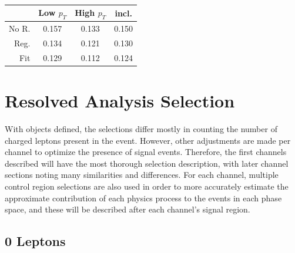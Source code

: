 \begin{table}
  \centering
  \caption[Mass resolutions after kinematic fit]{}
  \begin{tabular}{|r|c|c|c|}
    \hline
    & Low $p_T$ & High $p_T$ & incl. \\
    \hline
    No R. & 0.157 & 0.133 & 0.150 \\
    Reg.  & 0.134 & 0.121 & 0.130 \\
    Fit   & 0.129 & 0.112 & 0.124 \\
    \hline
  \end{tabular}
  \label{tab:kinfit}
\end{table}

\section{Resolved Analysis Selection}

With objects defined, the selections differ mostly in counting the number
of charged leptons present in the event.
However, other adjustments are made per channel to optimize the presence of signal events.
Therefore, the first channels described will have the most thorough selection description,
with later channel sections noting many similarities and differences.
For each channel, multiple control region selections are also used in order to more accurately
estimate the approximate contribution of each physics process to the events in each phase space,
and these will be described after each channel's signal region.

\subsection{0 Leptons}

